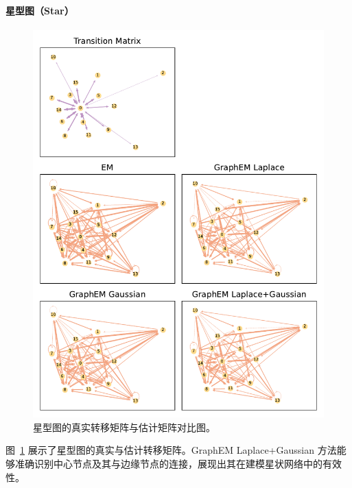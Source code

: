 \paragraph*{星型图（Star）}
\begin{figure}[tb]
    \centering
    \includegraphics[width=0.75\linewidth]{fig/star/graphs_for_true_and_EM.pdf}
    \caption{星型图的真实转移矩阵与估计矩阵对比图。}
    \label{fig: star graph comparison}
\end{figure}

图~\ref{fig: star graph comparison} 展示了星型图的真实与估计转移矩阵。GraphEM Laplace+Gaussian 方法能够准确识别中心节点及其与边缘节点的连接，展现出其在建模星状网络中的有效性。

\endinput
